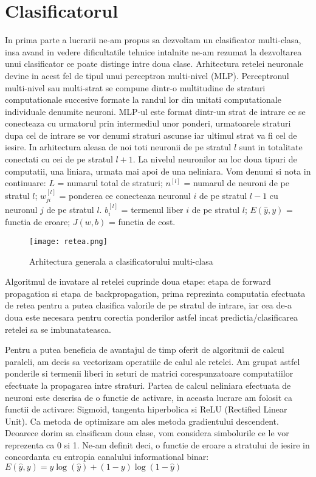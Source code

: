\section{Clasificatorul}

\quad In prima parte a lucrarii ne-am propus sa dezvoltam un clasificator 
multi-clasa, insa avand in vedere dificultatile tehnice intalnite ne-am rezumat la 
dezvoltarea unui clasificator ce poate distinge intre doua clase. Arhitectura retelei
neuronale devine in acest fel de tipul unui perceptron multi-nivel (MLP).
Perceptronul multi-nivel sau multi-strat se compune dintr-o multitudine de straturi
computationale succesive formate la randul lor din unitati computationale individuale
denumite neuroni. MLP-ul este format dintr-un strat de intrare ce se conecteaza cu
urmatorul prin intermediul unor ponderi, urmatoarele straturi dupa cel de intrare
se vor denumi straturi ascunse iar ultimul strat va fi cel de iesire. In arhitectura
aleasa de noi toti neuronii de pe stratul $ l $ sunt in totalitate conectati cu
cei de pe stratul $ l+1 $. La nivelul neuronilor au loc doua tipuri de computatii,
una liniara, urmata mai apoi de una neliniara.
Vom denumi si nota in continuare: $ L $ = numarul
total de straturi; $ n^{[l]} $ = numarul de neuroni de pe stratul $ l $;
$ w^{[l]}_{ji} $ = ponderea ce conecteaza neuronul $ i $ de pe stratul $ l-1 $
cu neuronul $ j $ de pe stratul $ l $. $ b^{[l]}_i $ = termenul liber $ i $ de pe
stratul $ l $; $ E(\hat{y}, y) $ = functia de eroare; $ J(w, b) $ = functia de
cost.

\begin{figure}[H]
	\texttt{[image: retea.png]}
	\centering
	\caption{Arhitectura generala a clasificatorului multi-clasa}
\end{figure}

Algoritmul de invatare al retelei cuprinde doua etape: etapa de forward propagation si etapa de backpropagation, prima reprezinta computatia efectuata de retea pentru a 
putea clasifica valorile de pe stratul de intrare, iar cea de-a doua este necesara 
pentru corectia ponderilor astfel incat predictia/clasificarea retelei sa se
imbunatateasca.

Pentru a putea beneficia de avantajul de timp oferit de algoritmii de calcul
paraleli, am decis sa vectorizam operatiile de calul ale retelei. Am grupat astfel
ponderile si termenii liberi in seturi de matrici corespunzatoare 
computatiilor efectuate la propagarea intre straturi. Partea de calcul neliniara
efectuata de neuroni este descrisa de o functie de activare, in aceasta lucrare
am folosit ca functii de activare: Sigmoid, tangenta hiperbolica si 
ReLU (Rectified Linear Unit). Ca metoda de optimizare am ales metoda gradientului
descendent. Deoarece dorim sa clasificam doua clase, vom considera simbolurile 
ce le vor reprezenta ca 0 si 1. Ne-am definit deci, o functie de eroare
a stratului de iesire in concordanta cu entropia canalului informational
binar: \\
$  E(\hat{y}, y) =   y\log{\left( \hat{y} \right)} + \left( 1 - y \right) \log{ \left( 1 - \hat{y} \right)}  $ \\


